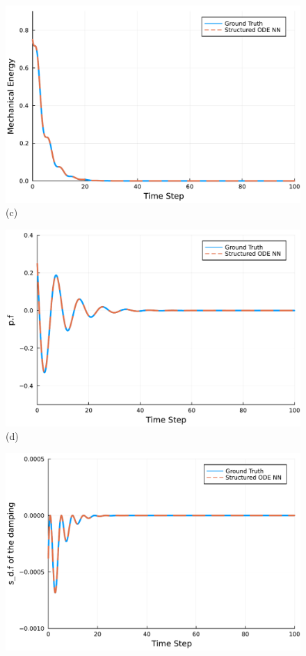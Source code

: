 \documentclass[
	parskip, 			   %
	twoside, 			   %
	DIV=14, 			   %
	BCOR=15.0mm, 		   %
	headsepline, 		   %
	open=right, 		   %
	captions=tableheading, %
	bibliography=totoc,    %
	numbers=noenddot       %
]{scrreprt}
\begin{document}
\begin{figure}[h!]
\begin{minipage}{.3\textwidth}
    \includegraphics[width=1\linewidth]{figures/Hamiltonian_evolution_compositional_ndho_with_EPHS_structure.pdf}
    \\(c)
    \end{minipage}
    \begin{minipage}{.3\textwidth}
    \centering
    \includegraphics[width=1\linewidth]{figures/p.f_compositional_ndho_with_EPHS_structure.pdf}
    \\(d)
    \end{minipage}%
    \begin{minipage}{.3\textwidth}
    \centering
    \includegraphics[width=1\linewidth]{figures/sd_d.f_compositional_ndho_with_EPHS_structure.pdf}

\end{minipage}
\end{figure}
\end{document}
